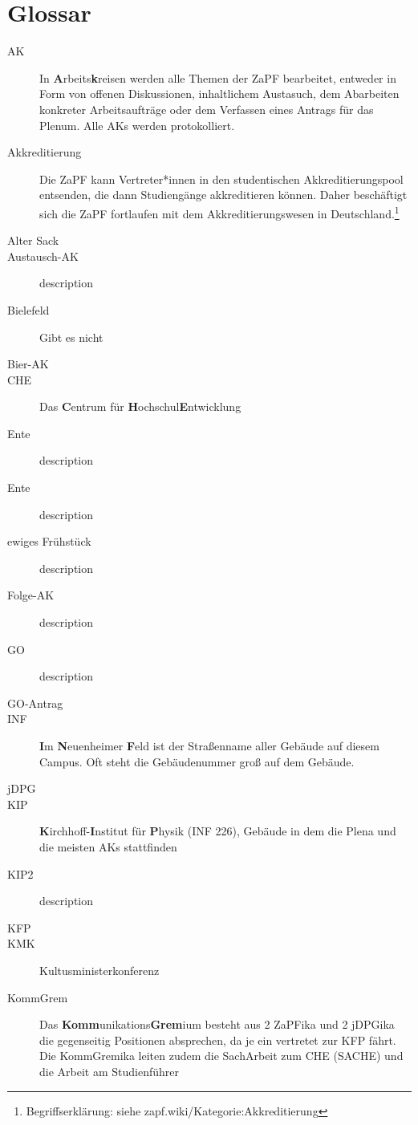 
\newcommand*{\fett}[1]{\textbf{#1}}

\chapter{Glossar}

\begin{description}
	\item[AK] In \fett{A}rbeits\fett{k}reisen werden alle Themen der ZaPF bearbeitet, entweder in Form von offenen Diskussionen, inhaltlichem Austasuch, dem Abarbeiten konkreter Arbeitsaufträge oder dem Verfassen eines Antrags für das Plenum. Alle AKs werden protokolliert.
	\item[Akkreditierung] Die ZaPF kann Vertreter*innen in den studentischen Akkreditierungspool entsenden, die dann Studiengänge akkreditieren können. Daher beschäftigt sich die ZaPF fortlaufen mit dem Akkreditierungswesen in Deutschland.\footnote{Begriffserklärung: siehe zapf.wiki/Kategorie:Akkreditierung}
	\item[Alter Sack] 
	\item[Austausch-AK] description
	\item[Bielefeld] Gibt es nicht
	\item[Bier-AK] 
	\item[CHE] Das \fett{C}entrum für \fett{H}ochschul\fett{E}ntwicklung 
	\item[Ente] description
	\item[Ente] description
	\item[ewiges Frühstück] description
	\item[Folge-AK] description
	\item[GO] description
	\item[GO-Antrag]
	\item[INF] \fett{I}m \fett{N}euenheimer \fett{F}eld ist der Straßenname aller Gebäude auf diesem Campus. Oft steht die Gebäudenummer groß auf dem Gebäude.
	\item[jDPG] 
	\item[KIP] \fett{K}irchhoff-\fett{I}nstitut für \fett{P}hysik (INF 226), Gebäude in dem die Plena und die meisten AKs stattfinden 
	\item[KIP2] description
	\item[KFP] 
	\item[KMK] Kultusministerkonferenz
	\item[KommGrem] Das \fett{Komm}unikations\fett{Grem}ium besteht aus 2 ZaPFika und 2 jDPGika die gegenseitig Positionen absprechen, da je ein vertretet zur KFP fährt. Die KommGremika leiten zudem die SachArbeit zum CHE (SACHE) und die Arbeit am Studienführer 

\end{description}
